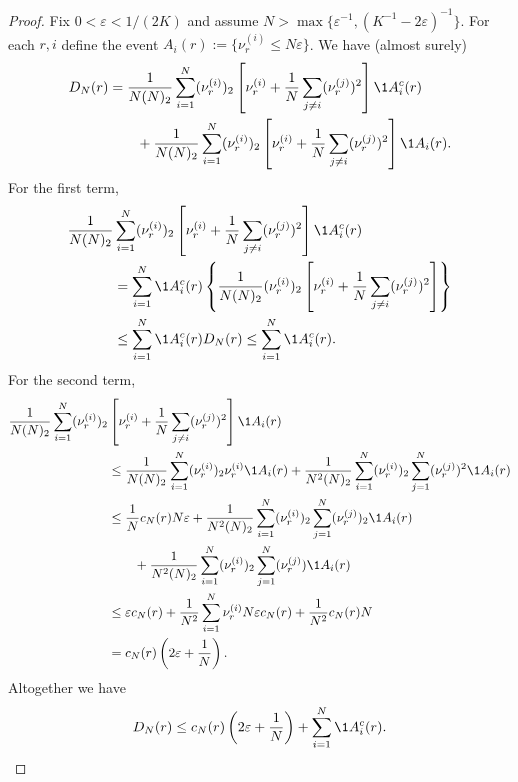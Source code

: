 \begin{proof}
Fix $0 < \varepsilon < 1/(2K)$ and assume $N > \max\{ \varepsilon^{-1}, (K^{-1} - 2\varepsilon)^{-1} \}$. For each $r,i$ define the event $A_i(r) := \{ \nu_r^{(i)} \leq N\varepsilon \}$.
We have (almost surely)
\begin{align*}
D_N(r)
&= \frac{1}{N(N)_2} \sum_{i=1}^N (\nu_r^{(i)})_2 \left[ \nu_r^{(i)} 
        + \frac{1}{N} \sum_{j\neq i} (\nu_r^{(j)})^2 \right] \1{A_i^c(r)} \\
    &\qquad+ \frac{1}{N(N)_2} \sum_{i=1}^N (\nu_r^{(i)})_2 \left[ \nu_r^{(i)} 
        + \frac{1}{N} \sum_{j\neq i} (\nu_r^{(j)})^2 \right] \1{A_i(r)} .
\end{align*}
For the first term, 
\begin{align*}
\frac{1}{N(N)_2} &\sum_{i=1}^N (\nu_r^{(i)})_2 \left[ \nu_r^{(i)} 
        + \frac{1}{N} \sum_{j\neq i} (\nu_r^{(j)})^2 \right] \1{A_i^c(r)} \\
&= \sum_{i=1}^N \1{A_i^c(r)} \left\{ \frac{1}{N(N)_2} (\nu_r^{(i)})_2 \left[ \nu_r^{(i)} 
        + \frac{1}{N} \sum_{j\neq i} (\nu_r^{(j)})^2 \right] \right\} \\
&\leq \sum_{i=1}^N \1{A_i^c(r)} D_N(r)
\leq \sum_{i=1}^N \1{A_i^c(r)} .
\end{align*}
For the second term,
\begin{align*}
\frac{1}{N(N)_2} \sum_{i=1}^N (\nu_r^{(i)})_2 &\left[ \nu_r^{(i)} 
        + \frac{1}{N} \sum_{j\neq i} (\nu_r^{(j)})^2 \right] \1{A_i(r)} \\
&\leq \frac{1}{N(N)_2} \sum_{i=1}^N (\nu_r^{(i)})_2 \nu_r^{(i)} \1{A_i(r)} 
        + \frac{1}{N^2(N)_2} \sum_{i=1}^N (\nu_r^{(i)})_2 \sum_{j=1}^N 
        (\nu_r^{(j)})^2 \1{A_i(r)} \\
&\leq \frac{1}{N} c_N(r) N\varepsilon
        + \frac{1}{N^2(N)_2} \sum_{i=1}^N (\nu_r^{(i)})_2 \sum_{j=1}^N 
        (\nu_r^{(j)})_2 \1{A_i(r)} \\
    &\qquad+ \frac{1}{N^2(N)_2} \sum_{i=1}^N (\nu_r^{(i)})_2 \sum_{j=1}^N 
        (\nu_r^{(j)}) \1{A_i(r)} \\
&\leq \varepsilon c_N(r) 
        + \frac{1}{N^2} \sum_{i=1}^N \nu_r^{(i)} N\varepsilon c_N(r) 
        + \frac{1}{N^2} c_N(r) N \\
&= c_N(r) \left( 2\varepsilon + \frac{1}{N} \right).
\end{align*}
Altogether we have
\begin{equation*}
D_N(r) 
\leq c_N(r) \left( 2\varepsilon + \frac{1}{N} \right)
        + \sum_{i=1}^N \1{A_i^c(r)} .
\end{equation*}

\end{proof}
